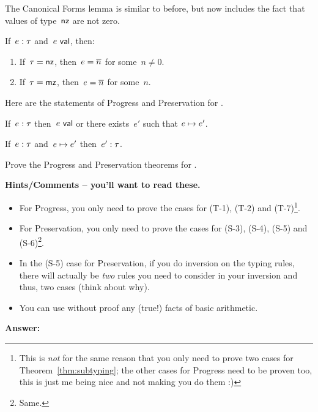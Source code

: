 \documentclass{article}
\begin{document}
The Canonical Forms lemma is similar to before, but now includes the fact that
values of type~$\mathsf{nz}$ are not zero.

\begin{lemma}
  If~$e : \tau$ and~$e ~\mathsf{val}$, then:
  \begin{enumerate}
  \item If~$\tau = \mathsf{nz}$, then~$e = \overline{n}$ for some~$n \neq 0$.
  \item If~$\tau = \mathsf{mz}$, then~$e = \overline{n}$ for some~$n$.
  \end{enumerate}
\end{lemma}

Here are the statements of Progress and Preservation for {\ezlang}.

\begin{thm}[Progress]
  If~$e : \tau$ then~$e ~\mathsf{val}$ or there exists~$e'$ such that
  $e \mapsto e'$.
\end{thm}

\begin{thm}[Preservation]
  If~$e : \tau$ and~$e \mapsto e'$ then~$e' : \tau$.
\end{thm}

\begin{task}
  Prove the Progress and Preservation theorems for {\ezlang}.

  \textbf{Hints/Comments -- you'll want to read these.}
  \begin{itemize}
  \item For Progress, you only need to prove the cases for (T-1), (T-2) and
    (T-7)\footnote{This is {\em not} for the same reason that you only need
    to prove two cases for Theorem~\ref{thm:subtyping}; the other cases
    for Progress need to be proven too, this is just me being nice and not
    making you do them :)}.
  \item For Preservation, you only need to prove the cases for (S-3),
    (S-4), (S-5) and (S-6)\footnote{Same.}.
  \item In the (S-5) case for Preservation, if you do inversion on the typing
    rules, there will actually be {\em two} rules you need to consider in your
    inversion and thus, two cases (think about why).
  \item You can use without proof any (true!) facts of basic arithmetic.
  \end{itemize}
\end{task}

\textbf{Answer:}
\end{document}
